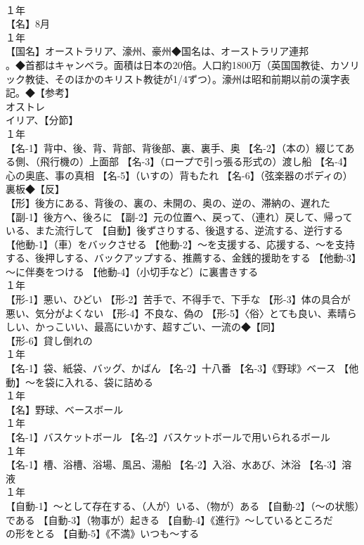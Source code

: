 \documentclass[8pt]{extreport}
\begin{document}
\begin{CJK}{UTF8}{min}
\\	１年	
\\	【名】8月
\\	１年	
\\	【国名】オーストラリア、濠州、豪州◆国名は、オーストラリア連邦
\\	。◆首都はキャンベラ。面積は日本の20倍。人口約1800万（英国国教徒、カソリック教徒、そのほかのキリスト教徒が1/4ずつ）。濠州は昭和前期以前の漢字表記。◆【参考】
\\	オストレ
\\	イリア、【分節】
\\	１年	
\\	【名-1】背中、後、背、背部、背後部、裏、裏手、奥 【名-2】（本の）綴じてある側、（飛行機の）上面部 【名-3】（ロープで引っ張る形式の）渡し船 【名-4】心の奥底、事の真相 【名-5】（いすの）背もたれ 【名-6】（弦楽器のボディの）裏板◆【反】
\\	【形】後方にある、背後の、裏の、未開の、奥の、逆の、滞納の、遅れた 【副-1】後方へ、後ろに 【副-2】元の位置へ、戻って、（連れ）戻して、帰っている、また流行して 【自動】後ずさりする、後退する、逆流する、逆行する 【他動-1】（車）をバックさせる 【他動-2】～を支援する、応援する、～を支持する、後押しする、バックアップする、推薦する、金銭的援助をする 【他動-3】～に伴奏をつける 【他動-4】（小切手など）に裏書きする
\\	１年	
\\	【形-1】悪い、ひどい 【形-2】苦手で、不得手で、下手な 【形-3】体の具合が悪い、気分がよくない 【形-4】不良な、偽の 【形-5】〈俗〉とても良い、素晴らしい、かっこいい、最高にいかす、超すごい、一流の◆【同】
\\	【形-6】貸し倒れの
\\	１年	
\\	【名-1】袋、紙袋、バッグ、かばん 【名-2】十八番 【名-3】《野球》ベース 【他動】～を袋に入れる、袋に詰める
\\	１年	
\\	【名】野球、ベースボール
\\	１年	
\\	【名-1】バスケットボール 【名-2】バスケットボールで用いられるボール
\\	１年	
\\	【名-1】槽、浴槽、浴場、風呂、湯船 【名-2】入浴、水あび、沐浴 【名-3】溶液
\\	１年	
\\	【自動-1】～として存在する、（人が）いる、（物が）ある 【自動-2】（～の状態）である 【自動-3】（物事が）起きる 【自動-4】《進行》～しているところだ
\\	の形をとる 【自動-5】《不満》いつも～する

\end{CJK}
\end{document}
